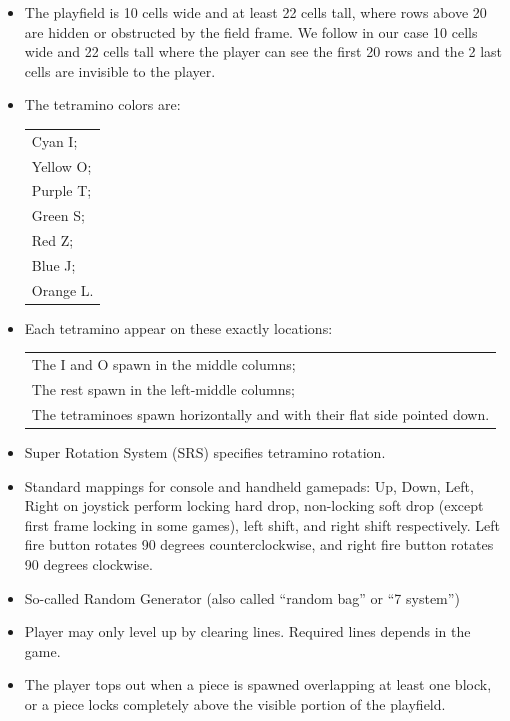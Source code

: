 \documentclass[a4paper]{article}
\begin{document}
\begin{itemize}
	\item The playfield is 10 cells wide and at least 22 cells tall, where rows above 20 are hidden or obstructed by the field frame. We follow in our case 10 cells wide and 22 cells tall where the player can see the first 20 rows and the 2 last cells are invisible to the player. 
	\item The tetramino colors are:
	
	\begin{tabular}{l}
		Cyan I;\\
		Yellow O;\\
		Purple T;\\
		Green S;\\
		Red Z;\\
		Blue J;\\
		Orange L.\\
	\end{tabular}
	
	\item Each tetramino appear on these exactly locations:
	
	\begin{tabular}{l}
		The I and O spawn in the middle columns;\\
		The rest spawn in the left-middle columns;\\
		The tetraminoes spawn horizontally and with their flat side pointed down.\\
	\end{tabular}
	
	\item Super Rotation System (SRS) specifies tetramino rotation.
	
	\item Standard mappings for console and handheld gamepads:
	Up, Down, Left, Right on joystick perform locking hard drop, non-locking soft drop (except first frame locking in some games), left shift, and right shift respectively.
	Left fire button rotates 90 degrees counterclockwise, and right fire button rotates 90 degrees clockwise.
		
	\item So-called Random Generator (also called ``random bag'' or ``7 system'')
					
	\item Player may only level up by clearing lines. Required lines depends in the game.
			
	\item The player tops out when a piece is spawned overlapping at least one block, or a piece locks completely above the visible portion of the playfield.
	
\end{itemize}
\end{document}
